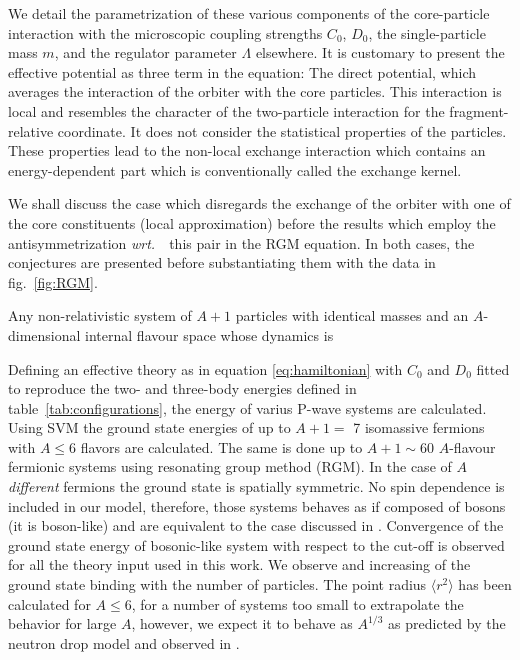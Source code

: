 \documentclass[preprint,12pt]{elsarticle}
\newcommand{\wrt}{\textit{wrt.}~}
\newcommand{\figref}[1]{fig.~\ref{#1}}
\newcommand{\tabref}[1]{table~\ref{#1}}
\begin{document}
We detail the parametrization of these various components of the core-particle interaction with the
microscopic coupling strengths $C_0$, $D_0$, the single-particle mass $m$, and the regulator parameter $\Lambda$
elsewhere. It is customary to present the effective potential as three term in the equation:
The direct potential, which averages the interaction of the orbiter with the core particles. This interaction is
local and resembles the character of the two-particle interaction for the fragment-relative coordinate. It does not
consider the statistical properties of the particles.
These properties lead to the non-local exchange interaction which contains an energy-dependent part which
is conventionally called the exchange kernel.

We shall discuss the case which disregards the exchange of the orbiter with one of the core constituents (local
approximation) before the results which employ the antisymmetrization \wrt~this pair in the RGM equation.
In both cases, the conjectures are presented before substantiating them with the data in \figref{fig:RGM}.

Any non-relativistic system of $A+1$ particles with identical masses and an $A$-dimensional internal flavour space
whose dynamics is 


\newpage
Defining an effective theory as in equation \ref{eq:hamiltonian} with $C_0$ and $D_0$ fitted to reproduce the two- and 
three-body energies defined in \tabref{tab:configurations}, the energy of varius P-wave systems are calculated.
Using SVM the ground state energies of up to $A+1=$ 7 isomassive fermions with $A \le $6 flavors are calculated.
The same is done up to $A+1\sim$60 $A$-flavour fermionic systems using resonating group method (RGM).
In the case of $A$ \textit{different} fermions the ground state is spatially symmetric.
No spin dependence is included in our model, therefore, those systems behaves as if composed of bosons (it is boson-like) 
and are equivalent to the case discussed in \cite{manybosons}.
Convergence of the ground state energy of bosonic-like system with respect to the cut-off is observed for all the theory 
input used in this work.
We observe and increasing of the ground state binding with the number of particles. 
The point radius $\langle r^2 \rangle$ has been calculated for $A\le6$, for a number of systems too small to extrapolate the 
behavior for large $A$, however, we expect it to behave as $A^{1/3}$ as predicted by the neutron drop model and observed in  
\cite{manybosons}.
\end{document}
